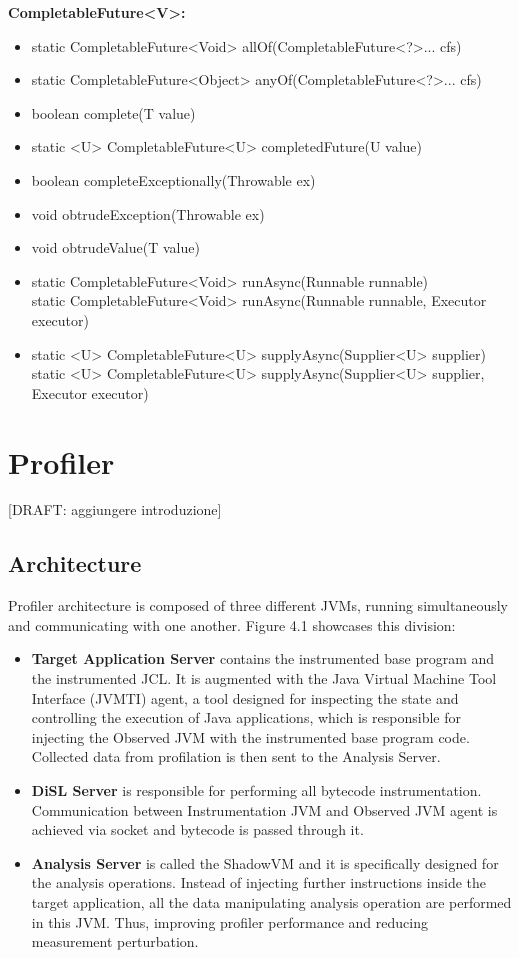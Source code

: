 \documentclass[]{usiinfthesis}
\begin{document}
{\noindent
\textbf{CompletableFuture<V>:}
\begin{itemize}
    \item   static CompletableFuture<Void> allOf(CompletableFuture<?>... cfs)
    \item   static CompletableFuture<Object> anyOf(CompletableFuture<?>... cfs)
    \item   boolean complete(T value)
    \item   static <U> CompletableFuture<U> completedFuture(U value)
    \item   boolean completeExceptionally(Throwable ex)
    \item   void obtrudeException(Throwable ex)
    \item   void obtrudeValue(T value)
    \item   static CompletableFuture<Void> runAsync(Runnable runnable)
    \mbox{}\\ static CompletableFuture<Void> runAsync(Runnable runnable, Executor executor)
    \item   static <U> CompletableFuture<U> supplyAsync(Supplier<U> supplier)
    \mbox{}\\ static <U> CompletableFuture<U> supplyAsync(Supplier<U> supplier, Executor executor)
\end{itemize}
}

\chapter{Profiler}
\large
[DRAFT: aggiungere introduzione]

\section{Architecture}

Profiler architecture is composed of three different JVMs, running simultaneously and communicating with one another. Figure 4.1 showcases this division:
\begin{itemize}
    \item \textbf{Target Application Server} contains the instrumented base program and the instrumented JCL. It is augmented with the Java Virtual Machine Tool Interface (JVMTI) agent, a tool designed for inspecting the state and controlling the execution of Java applications, which is responsible for injecting the Observed JVM with the instrumented base program code. Collected data from profilation is then sent to the Analysis Server. 
    \item \textbf{DiSL Server} is responsible for performing all bytecode instrumentation. Communication between Instrumentation JVM and Observed JVM agent is achieved via socket and bytecode is passed through it.
    \item \textbf{Analysis Server} is called the ShadowVM and it is specifically designed for the analysis operations. Instead of injecting further instructions inside the target application, all the data manipulating analysis operation are performed in this JVM. Thus, improving profiler performance and reducing measurement perturbation.
\end{itemize}
\end{document}
